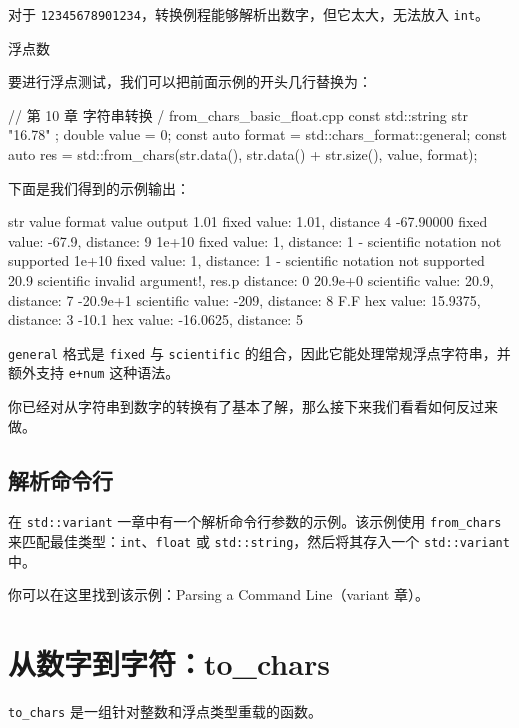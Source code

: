 对于 \texttt{12345678901234}，转换例程能够解析出数字，但它太大，无法放入 \texttt{int}。

浮点数

要进行浮点测试，我们可以把前面示例的开头几行替换为：

\begin{codebox}[cpp]
// 第 10 章 字符串转换 / from_chars_basic_float.cpp
const std::string str { "16.78" };
double value = 0;
const auto format = std::chars_format::general;
const auto res = std::from_chars(str.data(),
                                 str.data() + str.size(),
                                 value,
                                 format);
\end{codebox}

下面是我们得到的示例输出：

\begin{codebox}[cpp]
str value
format value
output
1.01
fixed
value: 1.01, distance 4
-67.90000
fixed
value: -67.9, distance: 9
1e+10
fixed
value: 1, distance: 1 - scientific notation not supported
1e+10
fixed
value: 1, distance: 1 - scientific notation not supported
20.9
scientific
invalid argument!, res.p distance: 0
20.9e+0
scientific
value: 20.9, distance: 7
-20.9e+1
scientific
value: -209, distance: 8
F.F
hex
value: 15.9375, distance: 3
-10.1
hex
value: -16.0625, distance: 5
\end{codebox}

\texttt{general} 格式是 \texttt{fixed} 与 \texttt{scientific} 的组合，因此它能处理常规浮点字符串，并额外支持 \texttt{e+num} 这种语法。

你已经对从字符串到数字的转换有了基本了解，那么接下来我们看看如何反过来做。

\subsection{解析命令行}

在 \texttt{std::variant} 一章中有一个解析命令行参数的示例。该示例使用 \texttt{from\_chars} 来匹配最佳类型：\texttt{int}、\texttt{float} 或 \texttt{std::string}，然后将其存入一个 \texttt{std::variant} 中。

你可以在这里找到该示例：Parsing a Command Line（variant 章）。

\section{从数字到字符：to\_chars}

\texttt{to\_chars} 是一组针对整数和浮点类型重载的函数。

